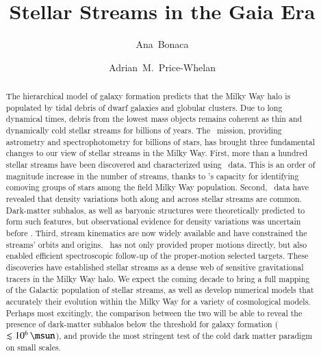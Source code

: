 \documentclass[final,5p,times,twocolumn,authoryear]{elsarticle}
\begin{document}
\begin{frontmatter}

\title{Stellar Streams in the Gaia Era}

\author[ociw]{Ana~Bonaca}
\author[cca]{Adrian~M.~Price-Whelan}




\begin{abstract}
The hierarchical model of galaxy formation predicts that the Milky Way halo is populated by tidal debris of dwarf galaxies and globular clusters.
Due to long dynamical times, debris from the lowest mass objects remains coherent as thin and dynamically cold stellar streams for billions of years.
The \gaia\ mission, providing astrometry and spectrophotometry for billions of stars, has brought three fundamental changes to our view of  stellar streams in the Milky Way.
First, more than a hundred stellar streams have been discovered and characterized using \gaia\ data.
This is an order of magnitude increase in the number of  streams, thanks to \gaia's
capacity for identifying comoving groups of stars among the field Milky Way population.
Second, \gaia\ data have revealed that density variations both along and across stellar streams are common.
Dark-matter subhalos, as well as baryonic structures were theoretically predicted to form such features, but observational evidence for density variations was uncertain before \gaia.
Third, stream kinematics are now widely available and have constrained the streams' orbits and origins.
\gaia\ has not only provided proper motions directly, but also enabled efficient spectroscopic follow-up of the proper-motion selected targets.
These discoveries have established stellar streams as a dense web of sensitive gravitational tracers in the Milky Way halo.
We expect the coming decade to bring a full mapping of the Galactic population of stellar streams, as well as develop numerical models that accurately  their evolution within the Milky Way for a variety of cosmological models.
Perhaps most excitingly, the comparison between the two will be able to reveal the presence of dark-matter subhalos below the threshold for galaxy formation ($\lesssim10^6\,\unit{\msun}$), and provide the most stringent test of the cold dark matter paradigm on small scales.
\end{abstract}


\end{frontmatter}
\end{document}
